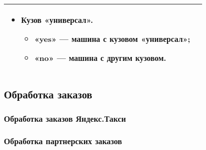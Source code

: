 \begin{longtable}{|p{4cm}|p{9cm}|}
\begin{itemize}
\begin{itemize}
															\end{itemize}
														\item Кузов «универсал».
															\begin{itemize} 
																\item «yes» — машина с кузовом «универсал»;
																\item «no» — машина с другим кузовом.
															\end{itemize}
													\end{itemize} \\ [2mm]
					\hline 
				\end{longtable}

	\subsection{Обработка заказов}

		\subsubsection{Обработка заказов Яндекс.Такси}

		\subsubsection{Обработка партнерских заказов}
